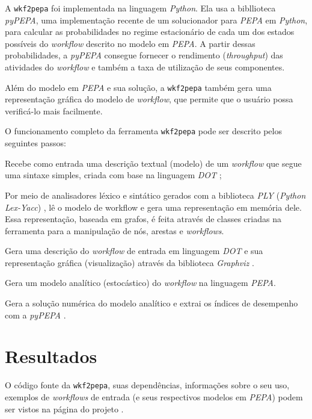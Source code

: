 \documentclass[a4paper,10pt]{article}
\begin{document}
        A \texttt{wkf2pepa} foi implementada na linguagem \emph{Python}. Ela usa a bibllioteca \emph{pyPEPA}\cite{web:pypepa}, uma implementação recente de um solucionador para \emph{PEPA} em \emph{Python}, para calcular as probabilidades no regime estacion\'ario de cada um dos estados poss\'iveis do \emph{workflow} descrito no modelo em \emph{PEPA}. A partir dessas probabilidades, a \emph{pyPEPA} consegue fornecer o rendimento (\emph{throughput}) das atividades do \emph{workflow} e também a taxa de utilizaç\~ao de seus componentes.

        Além do modelo em \emph{PEPA} e sua solução, a \texttt{wkf2pepa} também gera uma representação gráfica do modelo de \emph{workflow}, que permite que o usuário possa verificá-lo mais facilmente.

        O funcionamento completo da ferramenta \texttt{wkf2pepa} pode ser descrito pelos seguintes passos:
        \begin{enumerate*}
            \item Recebe como entrada uma descrição textual (modelo) de um \emph{workflow} que segue uma sintaxe simples, criada com base na linguagem \emph{DOT} \cite{web:dot};
            \item Por meio de analisadores léxico e sintático gerados com a biblioteca \emph{PLY} (\emph{Python Lex-Yacc}) \cite{web:ply}, lê o modelo de workflow e gera uma representação em memória dele. Essa representação, baseada em grafos, é feita através de classes criadas na ferramenta para a manipulação de nós, arestas e \emph{workflows}.
            \item Gera uma descrição do \emph{workflow} de entrada em linguagem \emph{DOT} e sua representação gráfica (visualização) através da biblioteca \emph{Graphviz} \cite{web:graphviz}.
            \item Gera um modelo analítico (estocástico) do \emph{workflow} na linguagem \emph{PEPA}.
            \item Gera a solução numérica do modelo analítico e extrai os índices de desempenho com a  \emph{pyPEPA} .
        \end{enumerate*}


    \section*{Resultados}

	O código fonte da \texttt{wkf2pepa}, suas dependências, informações sobre o seu uso, exemplos de \emph{workflows} de entrada (e seus respectivos modelos em \emph{PEPA}) podem ser vistos na página do projeto \cite{web:script}.
\end{document}
